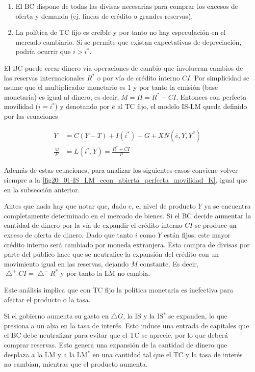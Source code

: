 \documentclass[DeGregorioResumen]{subfiles}
\begin{document}
\begin{enumerate}
	\item El BC dispone de todas las divisas necesarias para comprar los excesos de oferta y demanda (ej. líneas de crédito o grandes reservas).
	\item La política de TC fijo es creíble y por tanto no hay especulación en el mercado cambiario. Si se permite que existan expectativas de depreciación, podría ocurrir que $i>i^*$.
\end{enumerate}

El BC puede crear dinero vía operaciones de cambio que involucran cambios de las reservas internacionales $R^*$ o por vía de crédito interno $CI$. Por simplicidad se asume que el multiplicador monetario es 1 y por tanto la emisión (base monetaria) es igual al dinero, es decir, $M = H = R^* + CI$. Entonces con perfecta movilidad ($i=i^*$) y denotando por $\overline e$ al TC fijo, el modelo IS-LM queda definido por las ecuaciones

\begin{align}
	Y  &= C(Y-T) + I(i^*) + G + XN(\overline e, Y, Y^*) \\
	\frac{M}{P} &= L(i^*, Y) = \frac{R^*+CI}{P}
\end{align}

Además de estas ecuaciones, para analizar los siguientes casos conviene volver siempre a la \autoref{fig20_01-IS_LM_econ_abierta_perfecta_movilidad_K}, igual que en la subsección anterior.


Antes que nada hay que notar que, dado $\overline e$, el nivel de producto $Y$ ya se encuentra completamente determinado en el mercado de bienes. Si el BC decide aumentar la cantidad de dinero por la vía de expandir el crédito interno $CI$ se produce un exceso de oferta de dinero. Dado que tanto $i$ como $Y$ están fijos, este mayor crédito interno será cambiado por moneda extranjera. Esta compra de divisas por parte del público hace que se neutralice la expansión del crédito con un movimiento igual en las reservas, dejando $M$ constante. Es decir, $\bigtriangleup^+CI = \bigtriangleup^-R^*$ y por tanto la LM no cambia.

Este análisis implica que con TC fijo la política monetaria es inefectiva para afectar el producto o la tasa.


Si el gobierno aumenta su gasto en $\bigtriangleup G$, la IS y la IS$^*$ se expanden, lo que presiona a un alza en la tasa de interés. Esto induce una entrada de capitales que el BC debe neutralizar para evitar que el TC se aprecie, por lo que deberá comprar reservas. Esto genera una expansión de la cantidad de dinero que desplaza a la LM y a la LM$^*$ en una cantidad tal que el TC y la tasa de interés no cambian, mientras que el producto aumenta.
\end{document}
